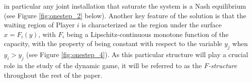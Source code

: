 \documentclass[10pt]{article}
\numberwithin{equation}{section}
\theoremstyle{plain}
\numberwithin{theorem}{section}
\theoremstyle{definition}
\newcommand{\<}{\langle}
\renewcommand{\>}{\rangle}
\renewcommand{\(}{\left(}
\renewcommand{\)}{\right)}
\begin{document}
{in particular any joint installation that saturate the system %
is a Nash equilibrium (see Figure \ref{fig:onestep_2} below). Another key feature of the solution is that the waiting region of Player $i$ is characterized as the region under the surface $x = F_i(y)$, with $F_i$ being a Lipschitz-continuous monotone function of the capacity, with the property of being constant with respect to the variable $y_j$ when {$y_i>y_j$} (see Figure \ref{fig:onestep_4}). As this particular structure will play a crucial role in the study of the dynamic game, it will be referred to as the \emph{$F$-structure} throughout the rest of the paper.  %

}
\end{document}

